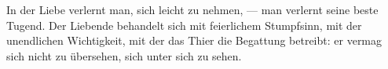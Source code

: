 In der Liebe verlernt man, sich leicht zu nehmen, — man verlernt seine beste Tugend. Der Liebende behandelt sich mit feierlichem Stumpfsinn, mit der unendlichen Wichtigkeit, mit der das Thier die Begattung betreibt: er vermag sich nicht zu übersehen, sich unter sich zu sehen.
\par

